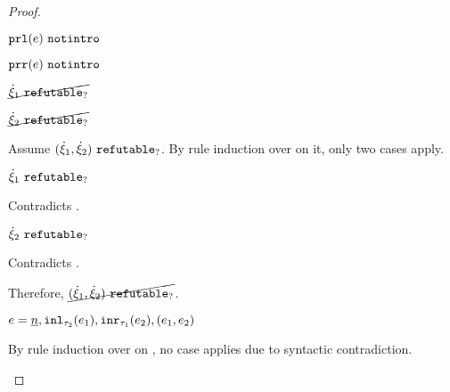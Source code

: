 \begin{proof}
\begin{byCases}
\begin{pfsteps*}
    \item $\mathtt{prl}(e) ~\mathtt{notintro}$  
    \item $\mathtt{prr}(e) ~\mathtt{notintro}$  
    \item $\cancel{\dot{\xi}_1 ~\mathtt{refutable}_?}$  
    \item $\cancel{\dot{\xi}_2 ~\mathtt{refutable}_?}$  
    \end{pfsteps*}
    Assume $(\dot{\xi}_1 , \dot{\xi}_2) ~\mathtt{refutable}_?$. By rule induction over  on it, only two cases apply.
    \begin{byCases}
    \item[\text{(\ref{rule:RXPairL})}]
        \begin{pfsteps*}
        \item $\dot{\xi}_1 ~\mathtt{refutable}_?$ 
        \end{pfsteps*}
        Contradicts .
    \item[\text{(\ref{rule:RXPairR})}]
        \begin{pfsteps*}
        \item $\dot{\xi}_2 ~\mathtt{refutable}_?$ 
        \end{pfsteps*}
        Contradicts .
    \end{byCases}
    Therefore, $\cancel{(\dot{\xi}_1 , \dot{\xi}_2) ~\mathtt{refutable}_?}$.
\item
    \begin{pfsteps*}
    \item $e=\underline{n},\mathtt{inl}_{\tau_2}({e_1}),\mathtt{inr}_{\tau_1}({e_2}),(e_1 , e_2)$ 
    \end{pfsteps*}
    By rule induction over  on , no case applies due to syntactic contradiction.
\end{byCases}
\resetpfcounter
\end{proof}

